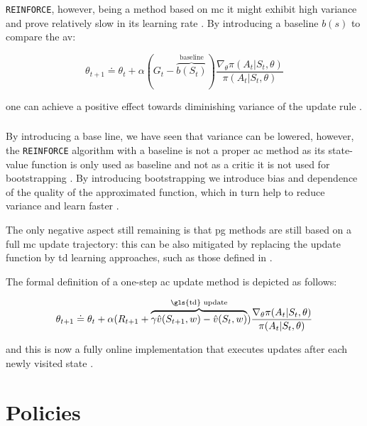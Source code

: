 \documentclass{seal_thesis}
\begin{document}
\texttt{REINFORCE}, however, being a method based on \gls{mc} it might exhibit high variance and prove relatively slow in its learning rate \cite[p. 271]{Sutton2017}. By introducing a baseline $b(s)$ to compare the \gls{av}:

\begin{equation}
	\theta_{t+1} \doteq \theta_t + \alpha (G_t - \overbrace{b(S_t)}^{\text{baseline}}) \frac{\nabla_\theta \pi(A_t|S_t,\theta)}{\pi(A_t|S_t,\theta)}
\end{equation}

one can achieve a positive effect towards diminishing variance of the update rule \cite[p. 271]{Sutton2017}.

\subsubsection{ }

By introducing a base line, we have seen that variance can be lowered, however, the \texttt{REINFORCE} algorithm with a baseline is not a proper \gls{ac} method as its state-value function is only used as baseline and not as a critic \ie it is not used for bootstrapping \cite[p. 273]{Sutton2017}. By introducing bootstrapping we introduce bias and dependence of the quality of the approximated function, which in turn help to reduce variance and learn faster \cite[p. 273]{Sutton2017}. 

The only negative aspect still remaining is that \gls{pg} methods are still based on a full \gls{mc} update trajectory: this can be also mitigated by replacing the update function by \gls{td} learning approaches, such as those defined in  \cite[p. 273]{Sutton2017}.

The formal definition of a one-step \gls{ac} update method is depicted as follows:

\begin{equation}
	\theta_{t+1} \doteq \theta_t + \alpha(R_{t+1} + \overbrace{\gamma \hat{v}(S_{t+1},w)-\hat{v}(S_t,w)}^{\text{\gls{td} update}}) \frac{\nabla_\theta \pi(A_t|S_t,\theta)}{\pi(A_t|S_t,\theta)}
\end{equation}

and this is now a fully online implementation that executes updates after each newly visited state \cite[p. 274]{Sutton2017}. 

\section{ Policies}
\label{sec:rl_policies}
\end{document}
